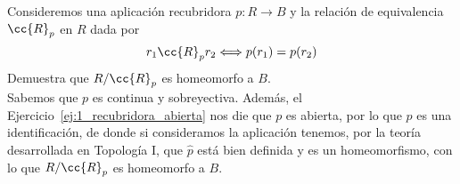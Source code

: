 \begin{ejercicio}
    Consideremos una aplicación recubridora $p:R\to B$ y la relación de equivalencia $\cc{R}_p$ en $R$ dada por
    \begin{equation*}
        r_1 \cc{R}_p r_2 \Longleftrightarrow p(r_1) = p(r_2)
    \end{equation*}
    Demuestra que $R/\cc{R}_p$ es homeomorfo a $B$.\\

    \noindent
    Sabemos que $p$ es continua y sobreyectiva. Además, el Ejercicio~\ref{ej:1_recubridora_abierta} nos die que $p$ es abierta, por lo que $p$ es una identificación, de donde si consideramos la aplicación
    tenemos, por la teoría desarrollada en Topología I, que $\hat{p}$ está bien definida y es un homeomorfismo, con lo que $R/\cc{R}_p$ es homeomorfo a $B$.
\end{ejercicio}

